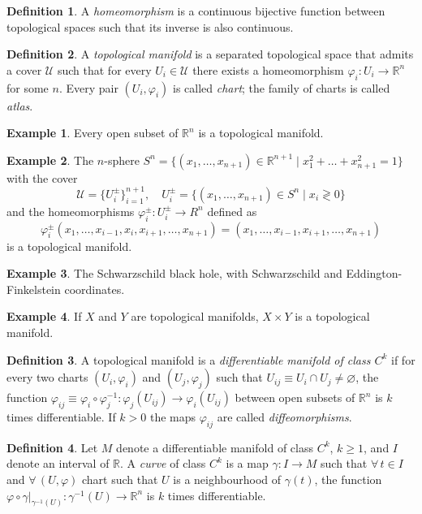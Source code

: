 \documentclass[a4paper,12pt]{book}
\theoremstyle{definition}
\newtheorem{definition}{Definition}
\newtheorem{example}{Example}
\theoremstyle{remark}
\begin{document}
\begin{definition}
A \emph{homeomorphism} is a continuous bijective function between topological spaces such that its inverse is also continuous.
\end{definition}

\begin{definition}
A \emph{topological manifold} is a separated topological space that admits a cover $\mathcal U$ such that for every $U_i\in\mathcal U$ there exists a homeomorphism $\varphi_i\colon U_i\to\mathbb{R}^n$ for some $n$. Every pair $(U_i,\varphi_i)$ is called \emph{chart}; the family of charts is called \emph{atlas}.
\end{definition}

\begin{example}
Every open subset of $\mathbb R^n$ is a topological manifold.
\end{example}

\begin{example}
The $n$-sphere $S^n=\{(x_1,\ldots,x_{n+1})\in\mathbb{R}^{n+1}\mid x_1^2+\ldots+x_{n+1}^2=1\}$ with the cover
\[\mathcal U=\{U_i^\pm\}_{i=1}^{n+1},\quad U_i^\pm=\{(x_1,\ldots,x_{n+1})\in S^n\mid x_i\gtrless0\}\]
and the homeomorphisms $\varphi_i^\pm\colon U_i^\pm\to R^n$ defined as
\[\varphi_i^\pm(x_1,\ldots,x_{i-1},x_i,x_{i+1},\ldots,x_{n+1})=(x_1,\ldots,x_{i-1},x_{i+1},\ldots,x_{n+1})\]
is a topological manifold.
\end{example}

\begin{example}
The Schwarzschild black hole, with Schwarzschild and Eddington-Finkelstein coordinates.
\end{example}

\begin{example}
If $X$ and $Y$ are topological manifolds, $X\times Y$ is a topological manifold.
\end{example}

\begin{definition}
A topological manifold is a \emph{differentiable manifold of class $C^k$} if for every two charts $(U_i,\varphi_i)$ and $(U_j,\varphi_j)$ such that $U_{ij}\equiv U_i\cap U_j\ne\varnothing$, the function $\varphi_{ij}\equiv \varphi_i\circ\varphi_j^{-1}\colon\varphi_j(U_{ij})\to\varphi_i(U_{ij})$ between open subsets of $\mathbb R^n$ is $k$ times differentiable. If $k>0$ the maps $\varphi_{ij}$ are called \emph{diffeomorphisms}.
\end{definition}

\begin{definition}
Let $M$ denote a differentiable manifold of class $C^k$, $k\ge1$, and $I$ denote an interval of $\mathbb R$. A \emph{curve} of class $C^k$ is a map $\gamma\colon I\to M$ such that $\forall\, t\in I$ and $\forall\, (U,\varphi)$ chart such that $U$ is a neighbourhood of $\gamma(t)$, the function $\varphi\circ\gamma\big|_{\gamma^{-1}(U)}\colon \gamma^{-1}(U)\to \mathbb R^n$ is $k$ times differentiable.
\end{definition}
\end{document}
